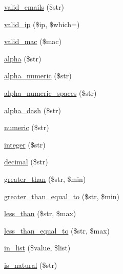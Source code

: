 \begin{DoxyCompactItemize}
\item 
\mbox{\hyperlink{class_c_i___form__validation_a7692019b59978c17621e3920823621c4}{valid\+\_\+emails}} (\$str)
\item 
\mbox{\hyperlink{class_c_i___form__validation_a10da42e1fde6cd5b335efcd2338c4ff8}{valid\+\_\+ip}} (\$ip, \$which=\textquotesingle{}\textquotesingle{})
\item 
\mbox{\hyperlink{class_c_i___form__validation_aac161b2e5731e6e6e653c960177e5622}{valid\+\_\+mac}} (\$mac)
\item 
\mbox{\hyperlink{class_c_i___form__validation_a4784b18b432005bec36cdf437353ec76}{alpha}} (\$str)
\item 
\mbox{\hyperlink{class_c_i___form__validation_aa3b561d437be2774b1a6850ada97024a}{alpha\+\_\+numeric}} (\$str)
\item 
\mbox{\hyperlink{class_c_i___form__validation_a9c7e61a17f9ff3cbf176d7afab3b1555}{alpha\+\_\+numeric\+\_\+spaces}} (\$str)
\item 
\mbox{\hyperlink{class_c_i___form__validation_a4d1ca92bb78369923e57b2f6aca58c70}{alpha\+\_\+dash}} (\$str)
\item 
\mbox{\hyperlink{class_c_i___form__validation_a058a2b065a28a929956630238d5bf5bb}{numeric}} (\$str)
\item 
\mbox{\hyperlink{class_c_i___form__validation_af1c6586c2e80ccbb28b09803c3b5461c}{integer}} (\$str)
\item 
\mbox{\hyperlink{class_c_i___form__validation_af460b7c2f8d785b7472329446c600f31}{decimal}} (\$str)
\item 
\mbox{\hyperlink{class_c_i___form__validation_a8dd73c5e1d6880a650bb41e1ec6ee2f4}{greater\+\_\+than}} (\$str, \$min)
\item 
\mbox{\hyperlink{class_c_i___form__validation_a003319a504eca3e9d1b608f8e48f2daf}{greater\+\_\+than\+\_\+equal\+\_\+to}} (\$str, \$min)
\item 
\mbox{\hyperlink{class_c_i___form__validation_a4f5222d1cc44e64ce520d94358f25291}{less\+\_\+than}} (\$str, \$max)
\item 
\mbox{\hyperlink{class_c_i___form__validation_aa7a42f791a145f6c36ad2b8babcb9c21}{less\+\_\+than\+\_\+equal\+\_\+to}} (\$str, \$max)
\item 
\mbox{\hyperlink{class_c_i___form__validation_a27365f05674ed5c959747000113f29aa}{in\+\_\+list}} (\$value, \$list)
\item 
\mbox{\hyperlink{class_c_i___form__validation_aaf9d0b9bdaaef3658a78dd6a01629e5d}{is\+\_\+natural}} (\$str)
\item 

\end{DoxyCompactItemize}
